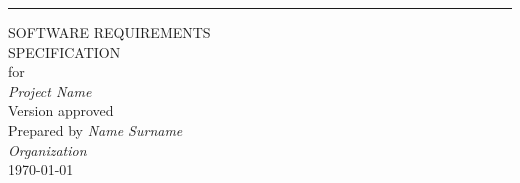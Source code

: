 \begin{flushright}
    \rule{16cm}{5pt}\vskip1cm
    \begin{bfseries}
        \Huge{SOFTWARE REQUIREMENTS\\ SPECIFICATION}\\
        \vspace{1.9cm}
        for\\
        \vspace{1.9cm}
	    \textit{Project Name}\\
        \vspace{1.9cm}
        \LARGE{Version \myversion approved}\\
        \vspace{1.9cm}
        Prepared by \textit{Name Surname}\\
        \vspace{1.9cm}
        \textit{Organization}\\
        \vspace{1.9cm}
        \today\\
    \end{bfseries}
\end{flushright}